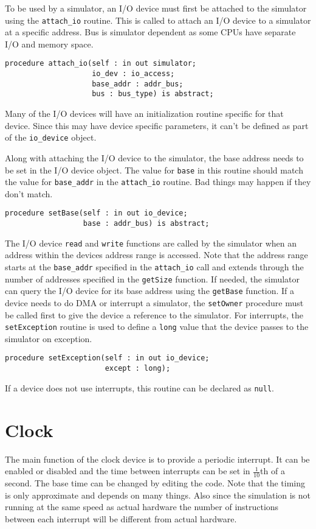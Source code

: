 \documentclass[10pt, openany]{book}
\newcommand{\function}[1]{\texttt{#1}}
\newcommand{\keyword}[1]{\texttt{#1}}
\newcommand{\datatype}[1]{\texttt{#1}}
\begin{document}
To be used by a simulator, an I/O device must first be attached to the simulator using the \function{attach\_io} routine.  This is called to attach an I/O device to a simulator at a specific address.  Bus is simulator dependent as some CPUs have separate I/O and memory space.
\begin{lstlisting}
procedure attach_io(self : in out simulator;
                    io_dev : io_access;
                    base_addr : addr_bus;
                    bus : bus_type) is abstract;
\end{lstlisting}

Many of the I/O devices will have an initialization routine specific for that device.  Since this may have device specific parameters, it can't be defined as part of the \datatype{io\_device} object.

Along with attaching the I/O device to the simulator, the base address needs to be set in the I/O device object.  The value for \keyword{base} in this routine should match the value for \keyword{base\_addr} in the \function{attach\_io} routine.  Bad things may happen if they don't match.
\begin{lstlisting}
procedure setBase(self : in out io_device;
                  base : addr_bus) is abstract;
\end{lstlisting}

The I/O device \verb|read| and \verb|write| functions are called by the simulator when an address within the devices address range is accessed.  Note that the address range starts at the \verb|base_addr| specified in the \verb|attach_io| call and extends through the number of addresses specified in the \verb|getSize| function.  If needed, the simulator can query the I/O device for its base address using the \verb|getBase| function.  If a device needs to do DMA or interrupt a simulator, the \verb|setOwner| procedure must be called first to give the device a reference to the simulator.  For interrupts, the \verb|setException| routine is used to define a \verb|long| value that the device passes to the simulator on exception.
\begin{lstlisting}
procedure setException(self : in out io_device;
                       except : long);
\end{lstlisting}

If a device does not use interrupts, this routine can be declared as \verb|null|.

\section{Clock}
The main function of the clock device is to provide a periodic interrupt.  It can be enabled or disabled and the time between interrupts can be set in $\frac{1}{10}$th of a second.  The base time can be changed by editing the code.  Note that the timing is only approximate and depends on many things.  Also since the simulation is not running at the same speed as actual hardware the number of instructions between each interrupt will be different from actual hardware.
\end{document}
